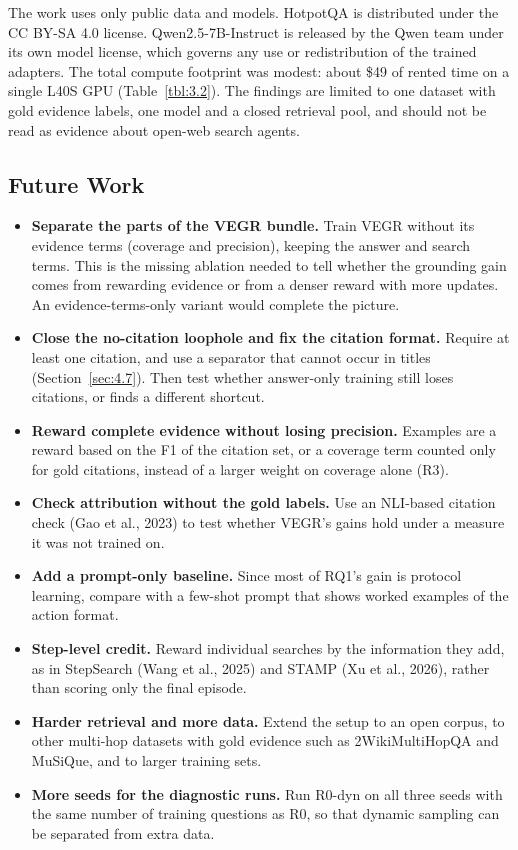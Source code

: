 The work uses only public data and models. HotpotQA is distributed under
the CC BY-SA 4.0 license. Qwen2.5-7B-Instruct is released by the Qwen
team under its own model license, which governs any use or
redistribution of the trained adapters. The total compute footprint was
modest: about \$49 of rented time on a single L40S GPU
(Table~\ref{tbl:3.2}). The findings are limited to one dataset with gold
evidence labels, one model and a closed retrieval pool, and should not
be read as evidence about open-web search agents.

\subsection{Future Work}\label{sec:5.5}

\begin{itemize}
\tightlist
\item
  \textbf{Separate the parts of the VEGR bundle.} Train VEGR without its
  evidence terms (coverage and precision), keeping the answer and search
  terms. This is the missing ablation needed to tell whether the
  grounding gain comes from rewarding evidence or from a denser reward
  with more updates. An evidence-terms-only variant would complete the
  picture.
\item
  \textbf{Close the no-citation loophole and fix the citation format.}
  Require at least one citation, and use a separator that cannot occur
  in titles (Section~\ref{sec:4.7}). Then test whether answer-only
  training still loses citations, or finds a different shortcut.
\item
  \textbf{Reward complete evidence without losing precision.} Examples
  are a reward based on the F1 of the citation set, or a coverage term
  counted only for gold citations, instead of a larger weight on
  coverage alone (R3).
\item
  \textbf{Check attribution without the gold labels.} Use an NLI-based
  citation check (Gao et al., 2023) to test whether VEGR's gains hold
  under a measure it was not trained on.
\item
  \textbf{Add a prompt-only baseline.} Since most of RQ1's gain is
  protocol learning, compare with a few-shot prompt that shows worked
  examples of the action format.
\item
  \textbf{Step-level credit.} Reward individual searches by the
  information they add, as in StepSearch (Wang et al., 2025) and STAMP
  (Xu et al., 2026), rather than scoring only the final episode.
\item
  \textbf{Harder retrieval and more data.} Extend the setup to an open
  corpus, to other multi-hop datasets with gold evidence such as
  2WikiMultiHopQA and MuSiQue, and to larger training sets.
\item
  \textbf{More seeds for the diagnostic runs.} Run R0-dyn on all three
  seeds with the same number of training questions as R0, so that
  dynamic sampling can be separated from extra data.
\end{itemize}
